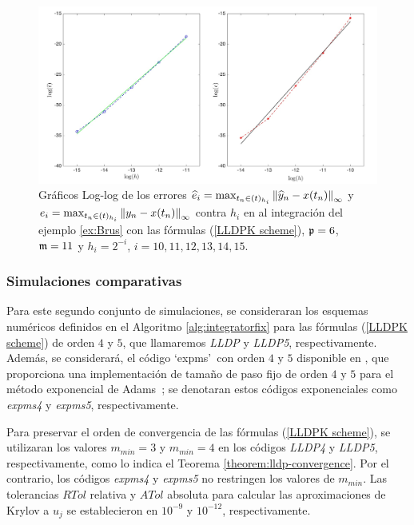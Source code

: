 \begin{figure}[htb]
	\begin{center}
		\includegraphics[scale=0.45]{Graphics/lldp/LLDP-plots.jpg}
		\caption{ Gráficos Log-log de los errores $\widehat{e}_i=\max_{t_n\in(t)_{h_i}}\left\lVert \widehat{y}_n-x(t_n) \right\rVert_\infty$ y $e_i=\max_{t_n\in(t)_{h_i}}\left\lVert y_n-x(t_n) \right\rVert_\infty$ contra $h_i$ en al integración del ejemplo \ref{ex:Brus} con las fórmulas (\ref{LLDPK scheme}), $\mathfrak{p}=6$, $\mathfrak{m}=11$ y $h_i=2^{-i}$, $i=10,11,12,13,14,15$.}
		\label{fig:num-exp-lldp-fix-step:Fig4}
	\end{center}
\end{figure}

\subsubsection{Simulaciones comparativas}
Para este segundo conjunto de simulaciones, se consideraran los esquemas numéricos definidos en el Algoritmo \ref{alg:integratorfix} para las fórmulas (\ref{LLDPK scheme}) de orden $4$ y $5$, que llamaremos \emph{LLDP} y \emph{LLDP5}, respectivamente. Además, se considerará, el código \textquoteleft expms\textquoteright~con orden $4$ y $5$ disponible en \cite{jansing2011expode}, que proporciona una implementación de tamaño de paso fijo de orden $4$ y $5$ para el método exponencial de Adams~\cite{hochbruck2011exponential}; se denotaran estos códigos exponenciales como \emph{expms4} y \emph{expms5}, respectivamente.

Para preservar el orden de convergencia de las fórmulas (\ref{LLDPK scheme}), se utilizaran los valores $m_{min}=3$ y $m_{min}=4$ en los códigos \emph{LLDP4} y \emph{LLDP5}, respectivamente, como lo indica el Teorema \ref{theorem:lldp-convergence}. Por el contrario, los códigos \emph{expms4} y \emph{expms5} no restringen los valores de $m_{min}$. Las tolerancias $RTol$ relativa y $ATol$ absoluta para calcular las aproximaciones de Krylov a $u_j$ se establecieron en $10^{-9}$ y $10^{-12}$, respectivamente.

